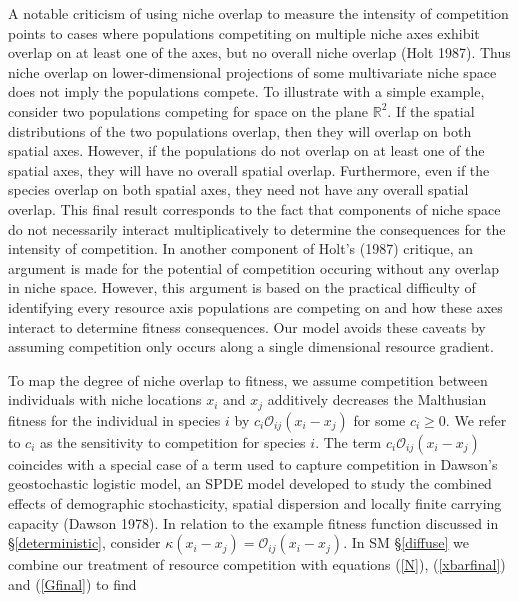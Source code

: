 \documentclass[]{article}
\begin{document}
A notable criticism of using niche overlap to measure the intensity of
competition points to cases where populations competiting on multiple
niche axes exhibit overlap on at least one of the axes, but no overall
niche overlap (Holt 1987). Thus niche overlap on lower-dimensional
projections of some multivariate niche space does not imply the
populations compete. To illustrate with a simple example, consider two
populations competing for space on the plane \(\mathbb{R}^2\). If the
spatial distributions of the two populations overlap, then they will
overlap on both spatial axes. However, if the populations do not overlap
on at least one of the spatial axes, they will have no overall spatial
overlap. Furthermore, even if the species overlap on both spatial axes,
they need not have any overall spatial overlap. This final result
corresponds to the fact that components of niche space do not
necessarily interact multiplicatively to determine the consequences for
the intensity of competition. In another component of Holt's (1987)
critique, an argument is made for the potential of competition occuring
without any overlap in niche space. However, this argument is based on
the practical difficulty of identifying every resource axis populations
are competing on and how these axes interact to determine fitness
consequences. Our model avoids these caveats by assuming competition
only occurs along a single dimensional resource gradient.

To map the degree of niche overlap to fitness, we assume competition
between individuals with niche locations \(x_i\) and \(x_j\) additively
decreases the Malthusian fitness for the individual in species \(i\) by
\(c_i\mathcal{O}_{ij}(x_i-x_j)\) for some \(c_i\geq0\). We refer to
\(c_i\) as the sensitivity to competition for species \(i\). The term
\(c_i\mathcal{O}_{ij}(x_i-x_j)\) coincides with a special case of a term
used to capture competition in Dawson's geostochastic logistic model, an
SPDE model developed to study the combined effects of demographic
stochasticity, spatial dispersion and locally finite carrying capacity
(Dawson 1978). In relation to the example fitness function discussed in
\S\ref{deterministic}, consider
\(\kappa(x_i-x_j)=\mathcal{O}_{ij}(x_i-x_j)\). In SM \S\ref{diffuse} we
combine our treatment of resource competition with equations (\ref{N}),
(\ref{xbarfinal}) and (\ref{Gfinal}) to find
\end{document}
